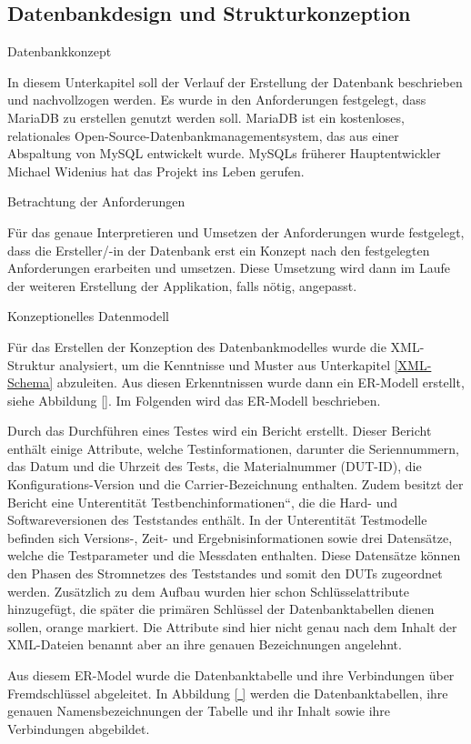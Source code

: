 \subsection{Datenbankdesign und Strukturkonzeption}
\label{subsec:datenbankdesign-und-strukturkonzeption}

Datenbankkonzept

In diesem Unterkapitel soll der Verlauf der Erstellung der Datenbank beschrieben und nachvollzogen werden. Es wurde in
den Anforderungen festgelegt, dass MariaDB zu erstellen genutzt werden soll. MariaDB ist ein kostenloses, relationales
Open-Source-Datenbankmanagementsystem, das aus einer Abspaltung von MySQL entwickelt wurde. MySQLs früherer
Hauptentwickler Michael Widenius hat das Projekt ins Leben gerufen.

Betrachtung der Anforderungen

Für das genaue Interpretieren und Umsetzen der Anforderungen wurde festgelegt, dass die Ersteller/-in der Datenbank erst
ein Konzept nach den festgelegten Anforderungen erarbeiten und umsetzen. Diese Umsetzung wird dann im Laufe der weiteren
Erstellung der Applikation, falls nötig, angepasst.

Konzeptionelles Datenmodell

Für das Erstellen der Konzeption des Datenbankmodelles wurde die XML-Struktur analysiert, um die Kenntnisse und Muster
aus Unterkapitel \ref{XML-Schema} abzuleiten. Aus diesen Erkenntnissen wurde dann ein ER-Modell erstellt, siehe Abbildung \ref{}.
Im Folgenden wird das ER-Modell beschrieben.

Durch das Durchführen eines Testes wird ein Bericht erstellt. Dieser Bericht enthält einige Attribute, welche
Testinformationen, darunter die Seriennummern, das Datum und die Uhrzeit des Tests, die Materialnummer (DUT-ID), die
Konfigurations-Version und die Carrier-Bezeichnung enthalten. Zudem besitzt der Bericht eine Unterentität
Testbenchinformationen“, die die Hard- und Softwareversionen des Teststandes enthält. In der Unterentität Testmodelle
befinden sich Versions-, Zeit- und Ergebnisinformationen sowie drei Datensätze, welche die Testparameter und die Messdaten
enthalten. Diese Datensätze können den Phasen des Stromnetzes des Teststandes und somit den DUTs zugeordnet werden.
Zusätzlich zu dem Aufbau wurden hier schon Schlüsselattribute hinzugefügt, die später die primären Schlüssel der
Datenbanktabellen dienen sollen, orange markiert. Die Attribute sind hier nicht genau nach dem Inhalt der XML-Dateien
benannt aber an ihre genauen Bezeichnungen angelehnt.

Aus diesem ER-Model wurde die Datenbanktabelle und ihre Verbindungen über Fremdschlüssel abgeleitet. In Abbildung \ref{ }
werden die Datenbanktabellen, ihre genauen Namensbezeichnungen der Tabelle und ihr Inhalt sowie ihre Verbindungen abgebildet.

